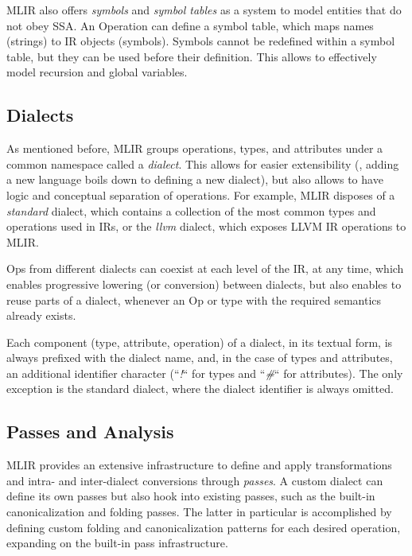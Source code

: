 MLIR also offers \textit{symbols} and \textit{symbol tables} as a system to model entities that do not obey SSA. An Operation can define a symbol table, which maps names (strings) to IR objects (symbols). Symbols cannot be redefined within a symbol table, but they can be used before their definition. This allows to effectively model recursion and global variables.


\subsection{Dialects}
As mentioned before, MLIR groups operations, types, and attributes under a common namespace called a \textit{dialect}. This allows for easier extensibility (\ie, adding a new language boils down to defining a new dialect), but also allows to have logic and conceptual separation of operations. For example, MLIR disposes of a \textit{standard} dialect, which contains a collection of the most common types and operations used in IRs, or the \textit{llvm} dialect, which exposes LLVM IR operations to MLIR.

Ops from different dialects can coexist at each level of the IR, at any time, which enables progressive lowering (or conversion) between dialects, but also enables to reuse parts of a dialect, whenever an Op or type with the required semantics already exists.

Each component (type, attribute, operation) of a dialect, in its textual form, is always prefixed with the dialect name, and, in the case of types and attributes, an additional identifier character (“\textit{!}“ for types and “\textit{\#}“ for attributes). The only exception is the standard dialect, where the dialect identifier is always omitted.



\subsection{Passes and Analysis}
\label{sec:pass}
MLIR provides an extensive infrastructure to define and apply transformations and intra- and inter-dialect conversions through \textit{passes}. A custom dialect can define its own passes but also hook into existing passes, such as the built-in canonicalization and folding passes. The latter in particular is accomplished by defining custom folding and canonicalization patterns for each desired operation, expanding on the built-in pass infrastructure.

